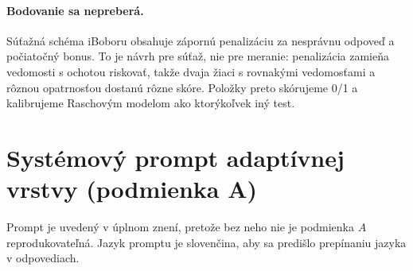\paragraph{Bodovanie sa nepreberá.} Súťažná schéma iBoboru obsahuje zápornú penalizáciu za nesprávnu odpoveď a počiatočný bonus. To je návrh pre súťaž, nie pre meranie: penalizácia zamieňa vedomosti s ochotou riskovať, takže dvaja žiaci s rovnakými vedomosťami a rôznou opatrnosťou dostanú rôzne skóre. Položky preto skórujeme 0/1 a kalibrujeme Raschovým modelom ako ktorýkoľvek iný test.

\section{Systémový prompt adaptívnej vrstvy (podmienka A)}
\label{sec:sysprompt}

Prompt je uvedený v úplnom znení, pretože bez neho nie je podmienka $A$ reprodukovateľná. Jazyk promptu je slovenčina, aby sa predišlo prepínaniu jazyka v odpovediach.

